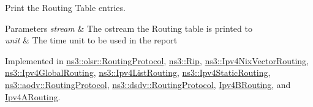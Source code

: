 Print the Routing Table entries. 


\begin{DoxyParams}{Parameters}
{\em stream} & The ostream the Routing table is printed to \\
\hline
{\em unit} & The time unit to be used in the report \\
\hline
\end{DoxyParams}


Implemented in \hyperlink{classns3_1_1olsr_1_1RoutingProtocol_a8b7d440d2ff617159fbf48c93e2ca895}{ns3\+::olsr\+::\+Routing\+Protocol}, \hyperlink{classns3_1_1Rip_ab1ac007cf3e796e4e7bc815c942a6ff5}{ns3\+::\+Rip}, \hyperlink{classns3_1_1Ipv4NixVectorRouting_ad9c8c58d1641ddc1b3dc6245f4d30213}{ns3\+::\+Ipv4\+Nix\+Vector\+Routing}, \hyperlink{classns3_1_1Ipv4GlobalRouting_aa8be09f66df028d8c3832c1c0da25a7b}{ns3\+::\+Ipv4\+Global\+Routing}, \hyperlink{classns3_1_1Ipv4ListRouting_afa8bf21c4f227a241a1db4a619b742fc}{ns3\+::\+Ipv4\+List\+Routing}, \hyperlink{classns3_1_1Ipv4StaticRouting_a917ee8a51016e159903df505bf7ded25}{ns3\+::\+Ipv4\+Static\+Routing}, \hyperlink{classns3_1_1aodv_1_1RoutingProtocol_a8c8226567e54cf4b98fa43349ed0725a}{ns3\+::aodv\+::\+Routing\+Protocol}, \hyperlink{classns3_1_1dsdv_1_1RoutingProtocol_ac13b00f0a73404bebf2a6fccfea987d9}{ns3\+::dsdv\+::\+Routing\+Protocol}, \hyperlink{classIpv4BRouting_a4173f33e77b523bf1651fc08e76c3288}{Ipv4\+B\+Routing}, and \hyperlink{classIpv4ARouting_ab78a61a72067edee90f0d1780cfa9044}{Ipv4\+A\+Routing}.

